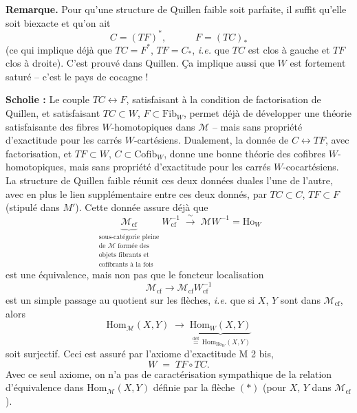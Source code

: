 \documentclass[11pt]{article}
\newcommand{\printedpage}[1]{\marginpar{\footnotesize p.~#1}}
\newcommand{\msp}[1]{\marginpar{\footnotesize [#1]}}
\newcommand{\Fib}{\mathrm{Fib}}
\begin{document}
\msp{page 29}
\noindent\textbf{Remarque.} Pour qu'une structure de Quillen faible soit parfaite, il suffit qu'elle soit biexacte et qu'on ait
\[
C = (TF)^*, \qquad\quad F = (TC)_*
\]
(ce qui implique déjà que $TC = F^*$, $TF = C_*$, \textit{i.e.} que $TC$ est clos à gauche et $TF$ clos à droite). C'est prouvé dans Quillen. Ça implique aussi que $W$ est fortement saturé -- c'est le pays de cocagne !

\clearpage
\printedpage{18}

\noindent\textbf{Scholie :} Le couple $TC \longleftrightarrow F$, satisfaisant à la condition de factorisation de Quillen, et satisfaisant $TC \subset W$, $F \subset \Fib_W$, permet déjà de développer une théorie satisfaisante des fibres $W$-homotopiques dans $\mathcal{M}$ -- mais sans propriété d'exactitude pour les carrés $W$-cartésiens. Dualement, la donnée de $C \longleftrightarrow TF$, avec factorisation, et $TF \subset W$, $C \subset \mathrm{Cofib}_W$, donne une bonne théorie des cofibres $W$-homotopiques, mais sans propriété d'exactitude pour les carrés $W$-cocartésiens. La structure de Quillen faible réunit ces deux données duales l'une de l'autre, avec en plus le lien supplémentaire entre ces deux donnés, par $TC \subset C$, $TF \subset F$ (stipulé dans $M'$). Cette donnée assure déjà que %
\[
\underbrace{\mathcal{M}_{\mathrm{cf}}}_{\substack{\text{sous-catégorie pleine}\\ \text{de $\mathcal{M}$ formée des}\\ \text{objets fibrants et}\\ \text{cofibrants à la fois}}} W_{\mathrm{cf}}^{-1} \;\xrightarrow{\ \sim\ }\; \mathcal{M}W^{-1} = \mathrm{Ho}_W
\]
\msp{page 30}
est une équivalence, mais non pas que le foncteur localisation
\[
\mathcal{M}_{\mathrm{cf}} \longrightarrow \mathcal{M}_{\mathrm{cf}}W_{\mathrm{cf}}^{-1}
\]
est un simple passage au quotient sur les flèches, \textit{i.e.} que si $X$, $Y$ sont dans $\mathcal{M}_{\mathrm{cf}}$, alors
\[
\mathrm{Hom}_{\mathcal{M}}(X, Y) \;\longrightarrow\; \underbrace{\mathrm{Hom}_W(X, Y)}_{\overset{\text{déf}}{=}\,\mathrm{Hom}_{\mathrm{Ho}_W}(X, Y)} \tag*{$(*)$}
\]
soit surjectif. Ceci est assuré par l'axiome d'exactitude M 2 bis,
\[
W \;=\; TF \circ TC.
\]
Avec ce seul axiome, on n'a pas de caractérisation sympathique de la relation d'équivalence dans $\mathrm{Hom}_{\mathcal{M}}(X, Y)$ définie par la flèche $(*)$ (pour $X$, $Y$ dans $\mathcal{M}_{\mathrm{cf}}$).
\end{document}
